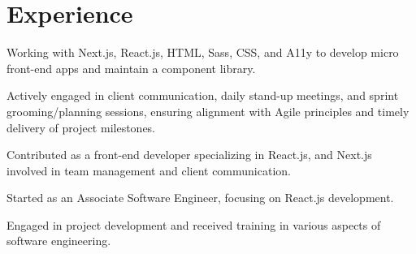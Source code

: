 \documentclass[letterpaper]{deedy-resume} %
\begin{document}
\hfill
%
%
\begin{minipage}[t]{0.66\textwidth} %


\section{Experience}


\vspace{\topsep} %
\begin{tightitemize}
\item Working with Next.js, React.js, HTML, Sass, CSS, and A11y to develop micro front-end apps and maintain a component library.
\item Actively engaged in client communication, daily stand-up meetings, and sprint grooming/planning sessions, ensuring alignment with Agile principles and timely delivery of project milestones.
\end{tightitemize}

\sectionspace %


\begin{tightitemize}
\item Contributed as a front-end developer specializing in React.js, and Next.js involved in team management and client communication.
\item Started as an Associate Software Engineer, focusing on React.js development.
\end{tightitemize}

\sectionspace %


\begin{tightitemize}
\item Engaged in project development and received training in various aspects of software engineering.
\end{tightitemize}


\end{minipage}
\end{document}

